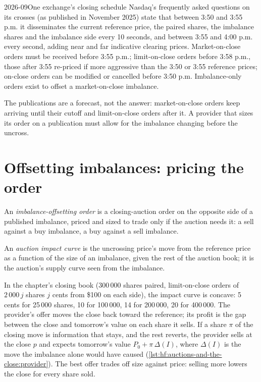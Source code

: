 \begin{dated}{2026-09}{One exchange's closing schedule}\label{dat:hf:auctions-and-the-close:nasdaq}
Nasdaq's frequently asked questions on its crosses (as published in November 2025) state that between 3:50 and 3:55 p.m. it disseminates the current
reference price, the paired shares, the imbalance shares and the imbalance side every 10 seconds, and between 3:55 and 4:00 p.m. every second, adding
near and far indicative clearing prices. Market-on-close orders must be received before 3:55 p.m.; limit-on-close orders before 3:58 p.m., those
after 3:55 re-priced if more aggressive than the 3:50 or 3:55 reference prices; on-close orders can be modified or cancelled before 3:50 p.m.
Imbalance-only orders exist to offset a market-on-close imbalance.
\end{dated}

The publications are a forecast, not the answer: market-on-close orders keep arriving until their cutoff and limit-on-close orders after it. A
provider that sizes its order on a publication must allow for the imbalance changing before the uncross.

\section{Offsetting imbalances: pricing the order}

\begin{definition}\label{def:hf:auctions-and-the-close:offset}
An \emph{imbalance-offsetting order} is a closing-auction order on the opposite side of a published imbalance,
priced and sized to trade only if the auction needs it: a sell against a buy imbalance, a buy against a sell imbalance.
\end{definition}

\begin{definition}\label{def:hf:auctions-and-the-close:impact}
An \emph{auction impact curve} is the uncrossing price's move from the reference price as a function of the size of an
imbalance, given the rest of the auction book; it is the auction's supply curve seen from the imbalance.
\end{definition}

In the chapter's closing book (300\,000 shares paired, limit-on-close orders of $2\,000\,j$ shares $j$ cents from \$100 on each side), the impact
curve is concave: 5 cents for 25\,000 shares, 10 for 100\,000, 14 for 200\,000, 20 for 400\,000. The provider's offer moves the close back toward the
reference; its profit is the gap between the close and tomorrow's value on each share it sells. If a share $\pi$ of the closing move is information
that stays, and the rest reverts, the provider sells at the close $p$ and expects tomorrow's value $P_0+\pi\,\Delta(I)$, where $\Delta(I)$ is the move
the imbalance alone would have caused (\cref{lst:hf:auctions-and-the-close:provider}). The best offer trades off size against price: selling more
lowers the close for every share sold.

